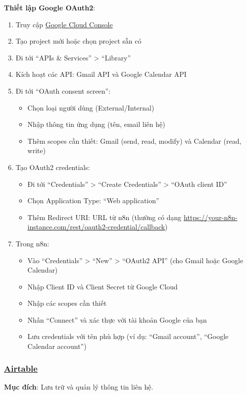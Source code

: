 \textbf{Thiết lập Google OAuth2}:
\begin{enumerate}
    \item Truy cập \href{https://console.cloud.google.com/}{Google Cloud Console}
    \item Tạo project mới hoặc chọn project sẵn có
    \item Đi tới ``APIs \& Services'' > ``Library''
    \item Kích hoạt các API: Gmail API và Google Calendar API
    \item Đi tới ``OAuth consent screen'':
    \begin{itemize}
        \item Chọn loại người dùng (External/Internal)
        \item Nhập thông tin ứng dụng (tên, email liên hệ)
        \item Thêm scopes cần thiết: Gmail (send, read, modify) và Calendar (read, write)
    \end{itemize}
    \item Tạo OAuth2 credentials:
    \begin{itemize}
        \item Đi tới ``Credentials'' > ``Create Credentials'' > ``OAuth client ID''
        \item Chọn Application Type: ``Web application''
        \item Thêm Redirect URI: URL từ n8n (thường có dạng \url{https://your-n8n-instance.com/rest/oauth2-credential/callback})
    \end{itemize}
    \item Trong n8n:
    \begin{itemize}
        \item Vào ``Credentials'' > ``New'' > ``OAuth2 API'' (cho Gmail hoặc Google Calendar)
        \item Nhập Client ID và Client Secret từ Google Cloud
        \item Nhập các scopes cần thiết
        \item Nhấn ``Connect'' và xác thực với tài khoản Google của bạn
        \item Lưu credentials với tên phù hợp (ví dụ: ``Gmail account'', ``Google Calendar account'')
    \end{itemize}
\end{enumerate}

\subsubsection{\underline{Airtable}}
\textbf{Mục đích}: Lưu trữ và quản lý thông tin liên hệ.

